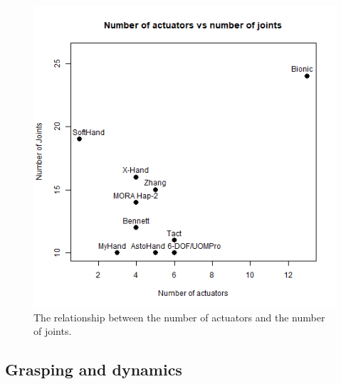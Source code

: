 \documentclass[a4paper, 10pt, conference]{ieeeconf}      %
\begin{document}
\begin{figure}[h]

	\centering
	\includegraphics[scale=0.4]{images/act-joints}
	
	\caption{The relationship between the number of actuators and the number of joints.}
	\label{fig:dia2}
\end{figure}

\subsection{Grasping and dynamics}
\end{document}
